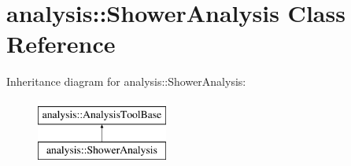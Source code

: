 \hypertarget{classanalysis_1_1ShowerAnalysis}{\section{analysis\-:\-:Shower\-Analysis Class Reference}
\label{classanalysis_1_1ShowerAnalysis}
}
Inheritance diagram for analysis\-:\-:Shower\-Analysis\-:\begin{figure}[H]
\begin{center}
\leavevmode
\includegraphics[height=2.000000cm]{classanalysis_1_1ShowerAnalysis}
\end{center}
\end{figure}
